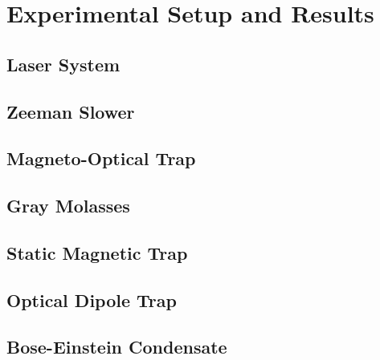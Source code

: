 \chapter{Experimental Setup and Results}

\section{Laser System}

\section{Zeeman Slower}

\section{Magneto-Optical Trap}

\section{Gray Molasses}

\section{Static Magnetic Trap}

\section{Optical Dipole Trap}

\section{Bose-Einstein Condensate}
